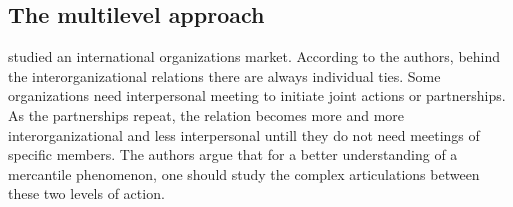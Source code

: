 \documentclass[a4paper, 12pt, openright, oneside, german, french, brazil, english, article]{abntex2}
\begin{document}
	
	\subsection{The multilevel approach}
	
 

        
	
	 studied an international organizations market. According to the authors, behind the interorganizational relations there are always individual ties. Some organizations need interpersonal meeting to initiate joint actions or partnerships. As the partnerships repeat, the relation becomes more and more interorganizational and less interpersonal untill they do not need meetings of specific members. The authors argue that for a better understanding of a mercantile phenomenon, one should study the complex articulations between these two levels of action.
	
	
\end{document}
